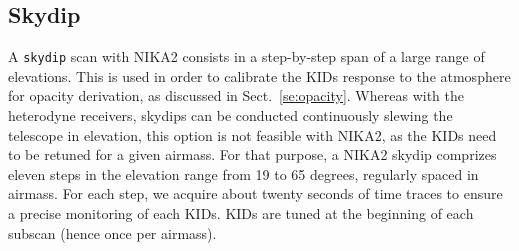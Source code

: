 


\subsection{Skydip}
\label{se:skydip}

A {\tt skydip} scan with NIKA2 consists in a step-by-step span
of a large range of elevations. This is used in order to calibrate the
KIDs response to the atmosphere for opacity derivation, as discussed in
Sect.~\ref{se:opacity}.
Whereas with the heterodyne receivers, skydips can be
conducted continuously slewing the telescope in elevation, this
option is not feasible with NIKA2, as the KIDs need to be retuned
for a given airmass.
For that purpose, a NIKA2 skydip comprizes eleven steps in
the elevation range from 19 to 65 degrees, regularly spaced in
airmass. For each step, we acquire about twenty seconds of time traces
to ensure a precise monitoring of each KIDs. KIDs are tuned at the beginning of
each subscan (hence once per airmass).
%

